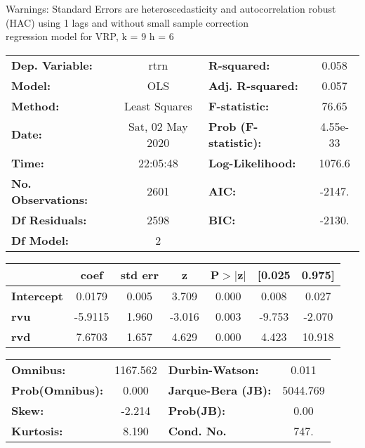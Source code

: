 Warnings: \newline
 [1] Standard Errors are heteroscedasticity and autocorrelation robust (HAC) using 1 lags and without small sample correction\\ 

regression model for VRP, k = 9 h = 6\begin{center}
\begin{tabular}{lclc}
\toprule
\textbf{Dep. Variable:}    &       rtrn       & \textbf{  R-squared:         } &     0.058   \\
\textbf{Model:}            &       OLS        & \textbf{  Adj. R-squared:    } &     0.057   \\
\textbf{Method:}           &  Least Squares   & \textbf{  F-statistic:       } &     76.65   \\
\textbf{Date:}             & Sat, 02 May 2020 & \textbf{  Prob (F-statistic):} &  4.55e-33   \\
\textbf{Time:}             &     22:05:48     & \textbf{  Log-Likelihood:    } &    1076.6   \\
\textbf{No. Observations:} &        2601      & \textbf{  AIC:               } &    -2147.   \\
\textbf{Df Residuals:}     &        2598      & \textbf{  BIC:               } &    -2130.   \\
\textbf{Df Model:}         &           2      & \textbf{                     } &             \\
\bottomrule
\end{tabular}
\begin{tabular}{lcccccc}
                   & \textbf{coef} & \textbf{std err} & \textbf{z} & \textbf{P$> |$z$|$} & \textbf{[0.025} & \textbf{0.975]}  \\
\midrule
\textbf{Intercept} &       0.0179  &        0.005     &     3.709  &         0.000        &        0.008    &        0.027     \\
\textbf{rvu}       &      -5.9115  &        1.960     &    -3.016  &         0.003        &       -9.753    &       -2.070     \\
\textbf{rvd}       &       7.6703  &        1.657     &     4.629  &         0.000        &        4.423    &       10.918     \\
\bottomrule
\end{tabular}
\begin{tabular}{lclc}
\textbf{Omnibus:}       & 1167.562 & \textbf{  Durbin-Watson:     } &    0.011  \\
\textbf{Prob(Omnibus):} &   0.000  & \textbf{  Jarque-Bera (JB):  } & 5044.769  \\
\textbf{Skew:}          &  -2.214  & \textbf{  Prob(JB):          } &     0.00  \\
\textbf{Kurtosis:}      &   8.190  & \textbf{  Cond. No.          } &     747.  \\
\bottomrule
\end{tabular}
\end{center}

